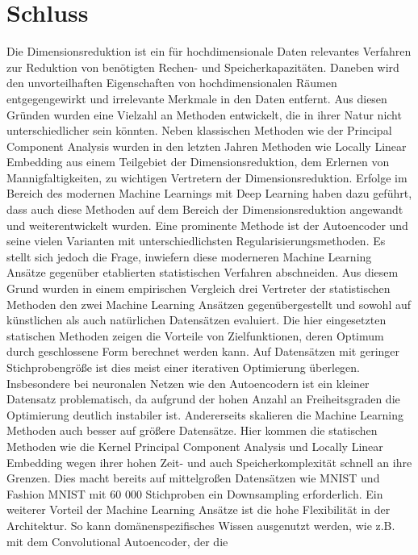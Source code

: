 \chapter{Schluss}
\label{ch:Schluss}

Die Dimensionsreduktion ist ein für hochdimensionale Daten relevantes Verfahren zur Reduktion von
benötigten Rechen- und Speicherkapazitäten. Daneben wird den unvorteilhaften Eigenschaften von
hochdimensionalen Räumen entgegengewirkt und irrelevante Merkmale in den Daten entfernt. Aus diesen
Gründen wurden eine Vielzahl an Methoden entwickelt, die in ihrer Natur nicht unterschiedlicher
sein könnten. Neben klassischen Methoden wie der Principal Component Analysis wurden in den letzten
Jahren Methoden wie Locally Linear Embedding aus einem Teilgebiet der Dimensionsreduktion, dem
Erlernen von Mannigfaltigkeiten, zu wichtigen Vertretern der Dimensionsreduktion. Erfolge im
Bereich des modernen Machine Learnings mit Deep Learning haben dazu geführt, dass auch diese
Methoden auf dem Bereich der Dimensionsreduktion angewandt und weiterentwickelt wurden. Eine
prominente Methode ist der Autoencoder und seine vielen Varianten mit unterschiedlichsten
Regularisierungsmethoden. Es stellt sich jedoch die Frage, inwiefern diese moderneren Machine
Learning Ansätze gegenüber etablierten statistischen Verfahren abschneiden. Aus diesem Grund wurden
in einem empirischen Vergleich drei Vertreter der statistischen Methoden den zwei Machine Learning
Ansätzen gegenübergestellt und sowohl auf künstlichen als auch natürlichen Datensätzen evaluiert.
Die hier eingesetzten statischen Methoden zeigen die Vorteile von Zielfunktionen, deren Optimum
durch geschlossene Form berechnet werden kann. Auf Datensätzen mit geringer Stichprobengröße ist
dies meist einer iterativen Optimierung überlegen. Insbesondere bei neuronalen Netzen wie den
Autoencodern ist ein kleiner Datensatz problematisch, da aufgrund der hohen Anzahl an
Freiheitsgraden die Optimierung deutlich instabiler ist. Andererseits skalieren die Machine
Learning Methoden auch besser auf größere Datensätze. Hier kommen die statischen Methoden wie die
Kernel Principal Component Analysis und Locally Linear Embedding wegen ihrer hohen Zeit- und auch
Speicherkomplexität schnell an ihre Grenzen. Dies macht bereits auf mittelgroßen Datensätzen wie
MNIST und Fashion MNIST mit 60 000 Stichproben ein Downsampling erforderlich. Ein weiterer Vorteil
der Machine Learning Ansätze ist die hohe Flexibilität in der Architektur. So kann
domänenspezifisches Wissen ausgenutzt werden, wie z.B. mit dem Convolutional Autoencoder, der die
